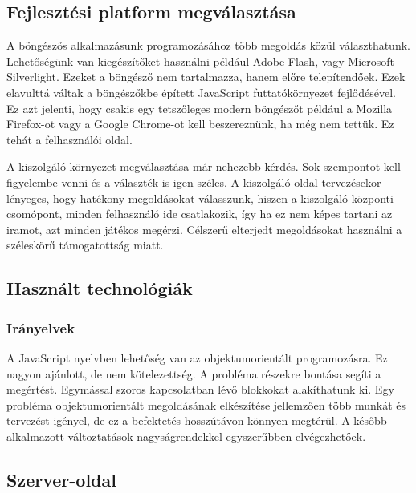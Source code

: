 \documentclass[]{article}
\begin{document}
\hypertarget{fejlesztuxe9si-platform-megvuxe1lasztuxe1sa}{%
\subsection{Fejlesztési platform
megválasztása}\label{fejlesztuxe9si-platform-megvuxe1lasztuxe1sa}}

A böngészős alkalmazásunk programozásához több megoldás közül
választhatunk. Lehetőségünk van kiegészítőket használni például Adobe
Flash, vagy Microsoft Silverlight. Ezeket a böngésző nem tartalmazza,
hanem előre telepítendőek. Ezek elavulttá váltak a böngészőkbe épített
JavaScript futtatókörnyezet fejlődésével. Ez azt jelenti, hogy csakis
egy tetszőleges modern böngészőt például a Mozilla Firefox-ot vagy a
Google Chrome-ot kell beszereznünk, ha még nem tettük. Ez tehát a
felhasználói oldal.

A kiszolgáló környezet megválasztása már nehezebb kérdés. Sok szempontot
kell figyelembe venni és a választék is igen széles. A kiszolgáló oldal
tervezésekor lényeges, hogy hatékony megoldásokat válasszunk, hiszen a
kiszolgáló központi csomópont, minden felhasználó ide csatlakozik, így
ha ez nem képes tartani az iramot, azt minden játékos megérzi. Célszerű
elterjedt megoldásokat használni a széleskörű támogatottság miatt.

\hypertarget{hasznuxe1lt-technoluxf3giuxe1k}{%
\subsection{Használt
technológiák}\label{hasznuxe1lt-technoluxf3giuxe1k}}

\hypertarget{iruxe1nyelvek}{%
\subsubsection{Irányelvek}\label{iruxe1nyelvek}}

A JavaScript nyelvben lehetőség van az objektumorientált programozásra.
Ez nagyon ajánlott, de nem kötelezettség. A probléma részekre bontása
segíti a megértést. Egymással szoros kapcsolatban lévő blokkokat
alakíthatunk ki. Egy probléma objektumorientált megoldásának elkészítése
jellemzően több munkát és tervezést igényel, de ez a befektetés
hosszútávon könnyen megtérül. A később alkalmazott változtatások
nagyságrendekkel egyszerűbben elvégezhetőek.

\hypertarget{szerver-oldal}{%
\subsection{Szerver-oldal}\label{szerver-oldal}}
\end{document}
